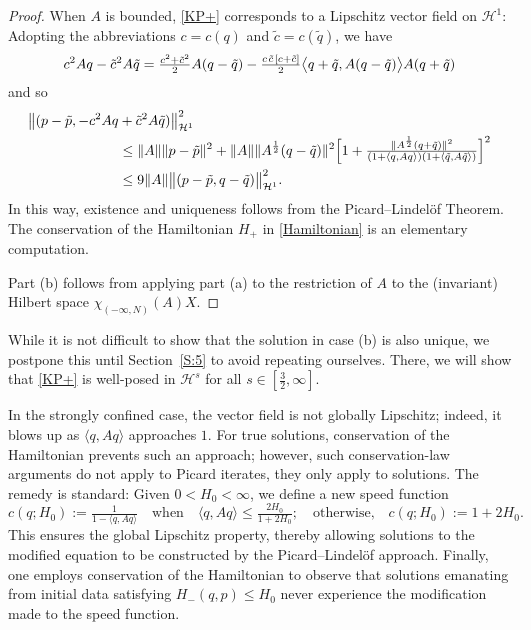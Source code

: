 \documentclass{amsart}
\newcommand{\qtq}[1]{\quad\text{#1}\quad}
\theoremstyle{definition}
\numberwithin{equation}{section}
\renewcommand{\H}{\mathcal H}
\newcommand{\la}{\langle}
\newcommand{\ra}{\rangle}
\begin{document}
\begin{proof}
When $A$ is bounded, \eqref{KP+} corresponds to a Lipschitz vector field on $\H^1$: Adopting the abbreviations $c=c(q)$ and $\tilde c = c(\tilde q)$, we have
\begin{align*}
c^2 Aq - \tilde c^2 A\tilde q = \tfrac{c^2+\tilde c^2}2 A(q-\tilde q)
-\tfrac{c \mskip2mu\tilde c \mskip2mu [c+ \tilde c]}2 \bigl\langle q+\tilde q, A (q-\tilde q)\bigr\rangle A(q+\tilde q)
\end{align*}
and so 
\begin{align*}
\bigl\|(p-\tilde p, -c^2 Aq &+ \tilde c^2 A\tilde q)\bigr\|_{\H^1}^2\\
&\leq \|A\| \|p-\tilde p\|^2 + \|A\| \|A^{\frac12}(q-\tilde q)\|^2\Bigl[ 1+ \tfrac{\|A^{\frac12}(q+\tilde q)\|^2}{(1+\la q, Aq\ra)(1+\la \tilde q, A\tilde q\ra)}\Bigr]^2\\
&\leq 9\|A\|\bigl\|(p-\tilde p, q-\tilde q)\bigr\|_{\H^1}^2 .
\end{align*}
In this way, existence and uniqueness follows from the Picard--Lindel\"of Theorem.  The conservation of the Hamiltonian $H_+$ in \eqref{Hamiltonian} is an elementary computation.

Part (b) follows from applying part (a) to the restriction of $A$ to the (invariant) Hilbert space $\chi_{(-\infty,N)}(A)X$.
\end{proof}

While it is not difficult to show that the solution in case (b) is also unique, we postpone this until Section~\ref{S:5} to avoid repeating ourselves.  There, we will show that \eqref{KP+} is well-posed in $\H^s$ for all $s\in[\frac32,\infty]$.

In the strongly confined case, the vector field is not globally Lipschitz; indeed, it blows up as $\langle q,A q\rangle$ approaches $1$. For true solutions, conservation of the Hamiltonian prevents such an approach; however, such conservation-law arguments do not apply to Picard iterates, they only apply to solutions.  The remedy is standard:  Given $0<H_0<\infty$, we define a new speed function
\begin{equation*}
c(q;H_0) := \tfrac{1}{1 - \langle q,A q\rangle} \qtq{when} \langle q,A q\rangle \leq \tfrac{2H_0}{1+2H_0}; \qtq{otherwise,}  c(q;H_0) := 1+2H_0.
\end{equation*}
This ensures the global Lipschitz property, thereby allowing solutions to the modified equation to be constructed by the Picard--Lindel\"of approach.  Finally, one employs conservation of the Hamiltonian to observe that solutions emanating from initial data satisfying $H_-(q,p)\leq H_0$ never experience the modification made to the speed function. 
\end{document}
